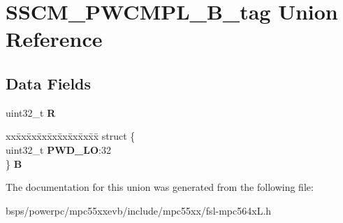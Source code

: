 \hypertarget{unionSSCM__PWCMPL__32B__tag}{}\section{S\+S\+C\+M\+\_\+\+P\+W\+C\+M\+P\+L\+\_\+B\+\_\+tag Union Reference}
\label{unionSSCM__PWCMPL__32B__tag}
\subsection*{Data Fields}
\begin{DoxyCompactItemize}
\item 
\mbox{\label{unionSSCM__PWCMPL__32B__tag_a09c0986363bf299196c4284743b1d794}} 
uint32\+\_\+t {\bfseries R}
\item 
\mbox{\label{unionSSCM__PWCMPL__32B__tag_a6c92a5222964e4a32dc0ec2af866e81b}} 
\begin{tabbing}
xx\=xx\=xx\=xx\=xx\=xx\=xx\=xx\=xx\=\kill
struct \{\\
\>uint32\_t {\bfseries PWD\_LO}:32\\
\} {\bfseries B}\\

\end{tabbing}\end{DoxyCompactItemize}


The documentation for this union was generated from the following file\+:\begin{DoxyCompactItemize}
\item 
bsps/powerpc/mpc55xxevb/include/mpc55xx/fsl-\/mpc564x\+L.\+h\end{DoxyCompactItemize}

